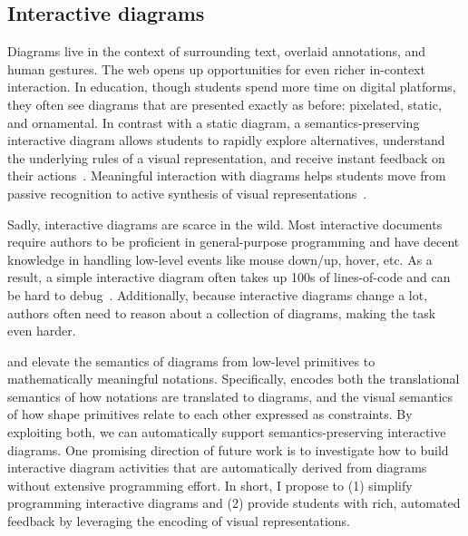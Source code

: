 
\subsection{Interactive diagrams}
\label{sec:interactive-diagram}


Diagrams live in the context of surrounding text, overlaid annotations, and human gestures. The web opens up opportunities for even richer in-context interaction. In education, though students spend more time on digital platforms, they often see diagrams that are presented exactly as before: pixelated, static, and ornamental. In contrast with a static diagram, a semantics-preserving interactive diagram allows students to rapidly explore alternatives, understand the underlying rules of a visual representation, and receive instant feedback on their actions~\cite{koedinger_learning_2015}. Meaningful interaction with diagrams helps students move from passive recognition to active synthesis of visual representations~\cite{bloomRevised}.

Sadly, interactive diagrams are scarce in the wild. Most interactive documents require authors to be proficient in general-purpose programming and have decent knowledge in handling low-level events like mouse down/up, hover, etc. As a result, a simple interactive diagram often takes up 100s of lines-of-code and can be hard to debug~\cite{callbackSpaghetti, letondal_usability_2010}. Additionally, because interactive diagrams change a lot, authors often need to reason about a collection of diagrams, making the task even harder.

\Penrose and \Edgeworth elevate the semantics of diagrams from low-level primitives to mathematically meaningful notations. Specifically, \Penrose encodes both the translational semantics of how notations are translated to diagrams, and the visual semantics of how shape primitives relate to each other expressed as constraints. By exploiting both, we can automatically support semantics-preserving interactive diagrams. One promising direction of future work is to investigate how to build interactive diagram activities that are automatically derived from \Penrose diagrams without extensive programming effort. In short, I propose to (1) simplify programming interactive diagrams and (2) provide students with rich, automated feedback by leveraging the encoding of visual representations. 


